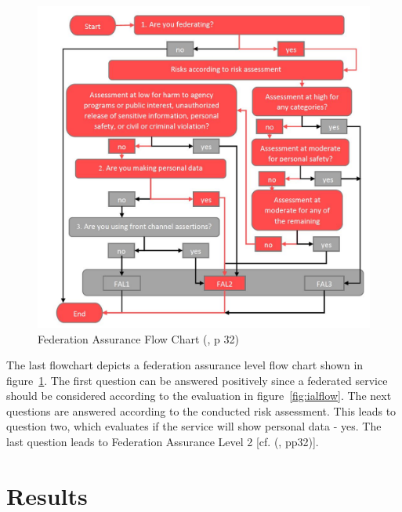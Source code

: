 \begin{figure}[h]
	\centering
	\includegraphics[width=1.0\linewidth]{images/fal_flow_colored}
	\caption{Federation Assurance Flow Chart (\cite{NIST:2017:DIG}, p 32)}
	\label{fig:falflow}
\end{figure}

The last flowchart depicts a federation assurance level flow chart shown in figure~\ref{fig:falflow}. The first question can be answered positively since a federated service should be considered according to the evaluation in figure~\ref{fig:ialflow}. The next questions are answered according to the conducted risk assessment. This leads to question two, which evaluates if the service will show personal data - yes. The last question leads to Federation Assurance Level 2 [cf. (\cite{NIST:2017:DIG}, pp32)]. 

\pagebreak[4]
\section{Results}
\label{resultSummary}

